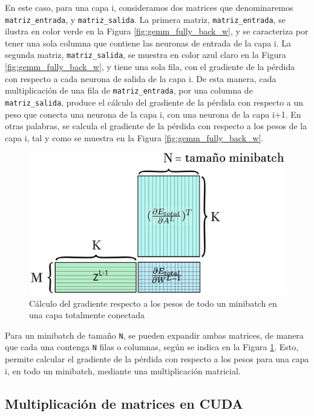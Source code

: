 En este caso, para una capa i, consideramos dos matrices que denominaremos \texttt{matriz\_entrada}, y \texttt{matriz\_salida}. La primera matriz, \texttt{matriz\_entrada}, se ilustra en color verde en la Figura \ref{fig:gemm_fully_back_w}, y se caracteriza por tener una sola columna que contiene las neuronas de entrada de la capa i. La segunda matriz, \texttt{matriz\_salida}, se muestra en color azul claro en la Figura \ref{fig:gemm_fully_back_w}, y tiene una sola fila, con el gradiente de la pérdida con respecto a cada neurona de salida de la capa i. De esta manera, cada multiplicación de una fila de \texttt{matriz\_entrada}, por una columna de \texttt{matriz\_salida}, produce el cálculo del gradiente de la pérdida con respecto a un peso que conecta una neurona de la capa i, con una neurona de la capa i+1. En otras palabras, se calcula el gradiente de la pérdida con respecto a los pesos de la capa i, tal y como se muestra en la Figura \ref{fig:gemm_fully_back_w}.

\begin{figure}[H]
	\centering
	\includegraphics[scale=0.25]{imagenes/gemm_fully_back_w_minibatch.jpg}  
	\caption{Cálculo del gradiente respecto a los pesos de todo un minibatch en una capa totalmente conectada}
	\label{fig:gemm_fully_back_w_minibatch}
\end{figure}

Para un minibatch de tamaño \texttt{N}, se pueden expandir ambas matrices, de manera que cada una contenga \texttt{N} filas o columnas, según se indica en la Figura \ref{fig:gemm_fully_back_w_minibatch}. Esto, permite calcular el gradiente de la pérdida con respecto a los pesos para una capa i, en todo un minibatch, mediante una multiplicación matricial.

\subsection{Multiplicación de matrices en CUDA}

